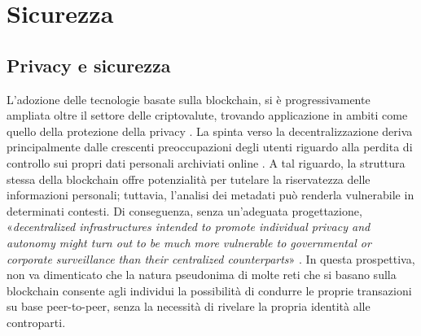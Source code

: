 \chapter{Sicurezza}
\section{Privacy e sicurezza}
L'adozione delle tecnologie basate sulla blockchain, si è progressivamente ampliata oltre il settore delle criptovalute, trovando applicazione in ambiti come quello della protezione della privacy \cite{borroni_blockchain_2019}.
La spinta verso la decentralizzazione deriva principalmente dalle crescenti preoccupazioni degli utenti riguardo alla perdita di controllo sui propri dati personali archiviati online \cite{rodota_quattro_paradigmi_2018} \cite{alpa_identita_digitale_2017}.
A tal riguardo, la struttura stessa della blockchain offre potenzialità per tutelare la riservatezza delle informazioni personali; tuttavia, l'analisi dei metadati può renderla vulnerabile in determinati contesti. Di conseguenza, senza un'adeguata progettazione,
«\textit{decentralized infrastructures intended to promote individual privacy and autonomy might turn out to be much more vulnerable to governmental or corporate surveillance than their centralized counterparts}» \cite{de_filippi_interplay_2016}.
In questa prospettiva, non va dimenticato che la natura pseudonima di molte
reti che si basano sulla blockchain consente agli individui la possibilità di
condurre le proprie transazioni su base peer-to-peer, senza la necessità di
rivelare la propria identità alle controparti.
